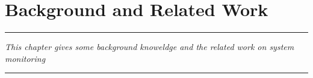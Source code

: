 \chapter{Background and Related Work}
\label{sec:bg}

\rule{\textwidth}{1pt}
{\em
This chapter gives some background knoweldge and the related work on system monitoring
}\\
\rule{\textwidth}{1pt}
\medskip


